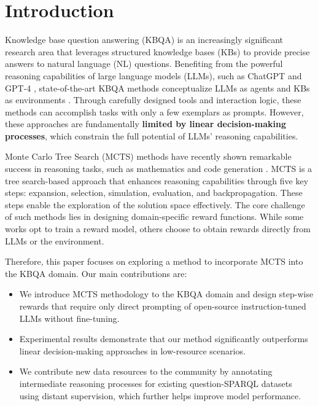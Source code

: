 \section{Introduction}

Knowledge base question answering (KBQA) is an increasingly significant research area that leverages structured knowledge bases (KBs) to provide precise answers to natural language (NL) questions.
Benefiting from the powerful reasoning capabilities of large language models (LLMs), such as ChatGPT \citep{Ouyang-Long-NeurIPS-2022-InstructGPT} and GPT-4 \citep{OpenAI-2023-GPT4}, state-of-the-art KBQA methods conceptualize LLMs as agents and KBs as environments \citep{Gu-Yu-arXiv-2024-Middleware,Jiang-Jinhao-arXiv-2024-KG-Agent,Xiong-Guanming-ACL-2024-Interactive-KBQA}. Through carefully designed tools and interaction logic, these methods can accomplish tasks with only a few exemplars as prompts. 
However, these approaches are fundamentally \textbf{limited by linear decision-making processes}, which constrain the full potential of LLMs' reasoning capabilities.

Monte Carlo Tree Search (MCTS) \citep{Swiechowski-2023-MCTS-Review} methods have recently shown remarkable success in reasoning tasks, such as mathematics and code generation \citep{Chen-Guoxin-NIPS-2024-AlphaMath,Zhang-Di-arXiv-2024-LLaMA-Berry,Wang-Chaojie-arXiv-2024-Q-star}. MCTS is a tree search-based approach that enhances reasoning capabilities through five key steps: expansion, selection, simulation, evaluation, and backpropagation. These steps enable the exploration of the solution space effectively. The core challenge of such methods lies in designing domain-specific reward functions. While some works opt to train a reward model, others choose to obtain rewards directly from LLMs or the environment.

Therefore, this paper focuses on exploring a method to incorporate MCTS into the KBQA domain. Our main contributions are:

\begin{itemize}[noitemsep] 
    \item We introduce MCTS methodology to the KBQA domain and design step-wise rewards that require only direct prompting of open-source instruction-tuned LLMs without fine-tuning.
    \item Experimental results demonstrate that our method significantly outperforms linear decision-making approaches in low-resource scenarios.
    \item We contribute new data resources to the community by annotating intermediate reasoning processes for existing question-SPARQL datasets using distant supervision, which further helps improve model performance.
\end{itemize}
